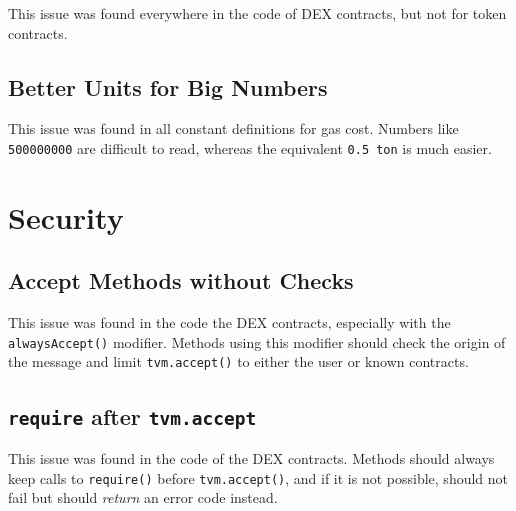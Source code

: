 
This issue was found everywhere in the code of DEX contracts, but not
for token contracts.

\subsection{Better Units for Big Numbers}
\label{readability:numbers}


This issue was found in all constant definitions for gas cost.
Numbers like {\tt 500000000} are difficult to read, whereas the
equivalent {\tt 0.5 ton} is much easier.


\section{Security}

\subsection{Accept Methods without Checks}
\label{accept:all}


This issue was found in the code the DEX contracts, especially with
the {\tt alwaysAccept()} modifier. Methods using this modifier should
check the origin of the message and limit {\tt tvm.accept()} to either
the user or known contracts.

\subsection{{\tt require} after {\tt tvm.accept}}
\label{accept:require}


This issue was found in the code of the DEX contracts. Methods should
always keep calls to {\tt require()} before {\tt tvm.accept()}, and if
it is not possible, should not fail but should {\em return} an error
code instead.

